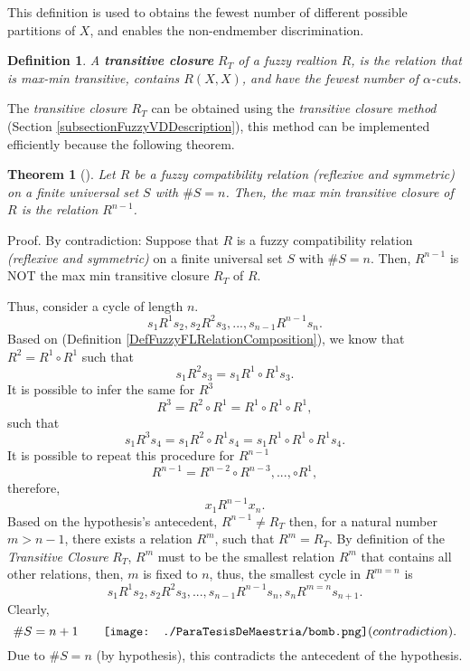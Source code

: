 \documentclass[11pt, oneside]{Thesis} %
\newtheorem{defi}{Definition}
\newtheorem{theo}{Theorem}
\newcommand*\bombcontradicts{\texttt{[image: ./ParaTesisDeMaestria/bomb.png]} (contradiction)}
\begin{document}
This definition is used to obtains the fewest number of different possible 
partitions of $X$, and enables the non-endmember discrimination.\\

\begin{defi}
  \label{DefTransitiveClosure}
  A \textbf{transitive closure} $R_T$ of a \emph{fuzzy realtion} $R$, 
  is the relation that is \emph{max-min transitive}, contains $R(X,X)$, 
  and have the fewest number of $\alpha$-cuts. \\
\end{defi}

The \emph{transitive closure $R_T$} can be obtained using the 
\emph{transitive closure method} (Section \ref{subsectionFuzzyVDDescription}), 
this method can be implemented efficiently because the following theorem.\\

\begin{theo}[\cite{Klir}]
  \label{TheoFLTransitiveClosure}
  Let $R$ be a fuzzy compatibility relation 
  \emph{(reflexive and symmetric)} on a finite universal set $S$ with 
  $\#S = n$. Then, the max min transitive closure of $R$ 
  is the relation $R^{n-1}$.\\
\end{theo}
Proof. By contradiction: Suppose that $R$ is a fuzzy compatibility relation 
\emph{(reflexive and symmetric)} on a finite universal set $S$ with 
$\#S = n$. Then, $R^{n-1}$ is NOT the max min transitive closure $R_T$ 
of $R$.

Thus, consider a cycle of length $n$.
\[s_1 R^1 s_2, s_2 R^2 s_3, ..., s_{n-1} R^{n-1} s_n. \]
Based on (Definition \ref{DefFuzzyFLRelationComposition}), we know that $R^2 = R^1 \circ R^1$ such that
\[s_1 R^2 s_3 = s_1 R^1 \circ R^1 s_3. \]
It is possible to infer the same for $R^3$
\[R^3 = R^2 \circ R^1 = R^1 \circ R^1 \circ R^1, \]
such that
\[s_1 R^3 s_4 = s_1 R^2 \circ R^1 s_4 = s_1 R^1 \circ R^1 \circ R^1 s_4. \]
It is possible to repeat this procedure for $R^{n-1}$
\[R^{n-1} = R^{n-2} \circ R^{n-3}, ..., \circ R^{1},\]
therefore,
\[x_1 R^{n-1} x_n.\]
Based on the hypothesis's antecedent, $R^{n-1} \neq R_T$ then, for a natural number $m > n-1$, 
there exists a relation $R^m$, such that $R^m = R_T$. By definition of the \emph{Transitive 
Closure} $R_T$, $R^m$ must to be the smallest relation $R^m$ that contains all other relations, 
then, $m$ is fixed to $n$, thus, the smallest cycle in $R^{m=n}$ is 
\[s_1 R^1 s_2, s_2 R^2 s_3, ..., s_{n-1} R^{n-1} s_n, s_{n} R^{m=n} s_{n+1}. \]
Clearly, \[\#S=n+1 \hspace{7mm} \bombcontradicts.\]
Due to $\#S=n$ (by hypothesis), this contradicts the antecedent of the hypothesis.\\
\end{document}
